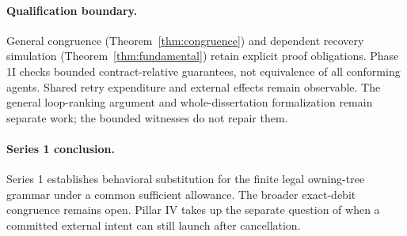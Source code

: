 \documentclass[11pt,a4paper]{article}
\theoremstyle{definition}
\theoremstyle{remark}
\begin{document}
\paragraph{Qualification boundary.} General congruence (Theorem~\ref{thm:congruence}) and dependent recovery simulation (Theorem~\ref{thm:fundamental}) retain explicit proof obligations. Phase 1I checks bounded contract-relative guarantees, not equivalence of all conforming agents. Shared retry expenditure and external effects remain observable. The general loop-ranking argument and whole-dissertation formalization remain separate work; the bounded witnesses do not repair them.

\paragraph{Series 1 conclusion.} Series 1 establishes behavioral substitution for the finite legal owning-tree grammar under a common sufficient allowance. The broader exact-debit congruence remains open. Pillar IV takes up the separate question of when a committed external intent can still launch after cancellation.



\end{document}
